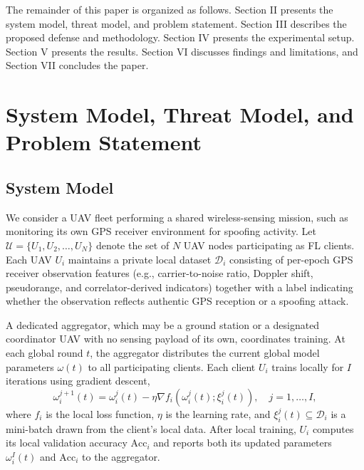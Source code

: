\documentclass[journal]{IEEEtran}
\begin{document}
The remainder of this paper is organized as follows. Section II presents the system model, threat model, and problem statement. Section III describes the proposed defense and methodology. Section IV presents the experimental setup. Section V presents the results. Section VI discusses findings and limitations, and Section VII concludes the paper.

\section{System Model, Threat Model, and Problem Statement}

\subsection{System Model}
We consider a UAV fleet performing a shared wireless-sensing mission, such as monitoring its own GPS receiver environment for spoofing activity. Let $\mathcal{U} = \{U_1, U_2, \ldots, U_N\}$ denote the set of $N$ UAV nodes participating as FL clients. Each UAV $U_i$ maintains a private local dataset $\mathcal{D}_i$ consisting of per-epoch GPS receiver observation features (e.g., carrier-to-noise ratio, Doppler shift, pseudorange, and correlator-derived indicators) together with a label indicating whether the observation reflects authentic GPS reception or a spoofing attack.

A dedicated aggregator, which may be a ground station or a designated coordinator UAV with no sensing payload of its own, coordinates training. At each global round $t$, the aggregator distributes the current global model parameters $\omega(t)$ to all participating clients. Each client $U_i$ trains locally for $I$ iterations using gradient descent,
\begin{equation}
\omega_i^{j+1}(t) = \omega_i^{j}(t) - \eta \nabla f_i\!\left(\omega_i^{j}(t); \xi_i^{j}(t)\right), \quad j = 1,\ldots,I,
\label{eq:local_update}
\end{equation}
where $f_i$ is the local loss function, $\eta$ is the learning rate, and $\xi_i^{j}(t) \subseteq \mathcal{D}_i$ is a mini-batch drawn from the client's local data. After local training, $U_i$ computes its local validation accuracy $\mathrm{Acc}_i$ and reports both its updated parameters $\omega_i^{I}(t)$ and $\mathrm{Acc}_i$ to the aggregator.
\end{document}
